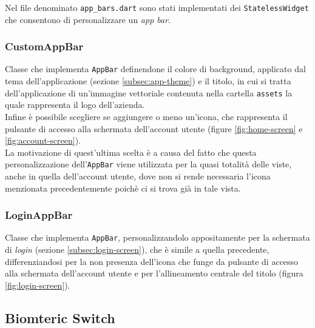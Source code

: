 Nel file denominato \lstinline{app_bars.dart} sono stati implementati dei \lstinline{StatelessWidget} che consentono di personalizzare un \emph{app bar}.

\subsubsection*{CustomAppBar}
\label{subsubsec:custom-app-bar}

Classe che implementa \lstinline{AppBar}\cite{site:app-bar} definendone il colore di background, applicato dal tema dell'applicazione (sezione \ref{subsec:app-theme}) e il titolo, in cui si tratta dell'applicazione di un'immagine vettoriale contenuta nella cartella \lstinline{assets} la quale rappresenta il logo dell'azienda.\\
Infine è possibile scegliere se aggiungere o meno un'icona, che rappresenta il pulsante di accesso alla schermata dell'account utente (figure \ref{fig:home-screen} e \ref{fig:account-screen}).\\
La motivazione di quest'ultima scelta è a causa del fatto che questa personalizzazione dell'\lstinline{AppBar} viene utilizzata per la quasi totalità delle viste, anche in quella dell'account utente, dove non si rende necessaria l'icona menzionata precedentemente poichè ci si trova già in tale vista.

\subsubsection*{LoginAppBar}
\label{subsubsec:login-app-bar}

Classe che implementa \lstinline{AppBar}, personalizzandolo appositamente per la schermata di \emph{login} (sezione \ref{subsec:login-screen}), che è simile a quella precedente, differenziandosi per la non presenza dell'icona che funge da pulsante di accesso alla schermata dell'account utente e per l'allineamento centrale del titolo (figura \ref{fig:login-screen}).

\subsection{Biomteric Switch}
\label{subsec:biometric-switch}


